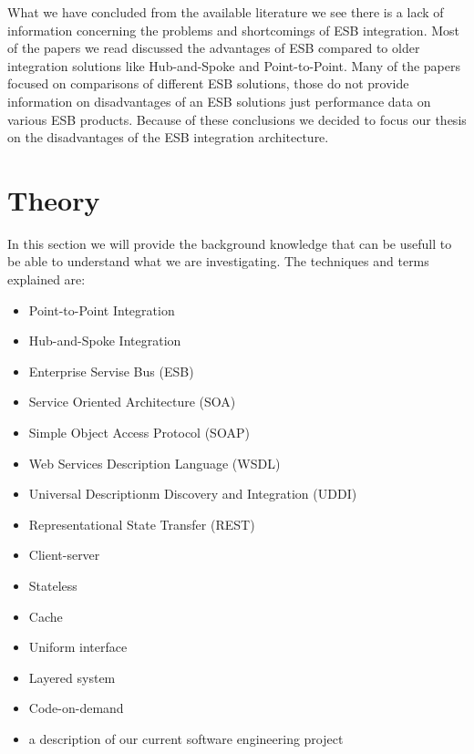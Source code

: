 \documentclass{llncs}
\begin{document}
What we have concluded from the available literature we see there is a lack of information concerning the problems and shortcomings of ESB integration.
Most of the papers we read discussed the advantages of ESB compared to older integration solutions like Hub-and-Spoke and Point-to-Point. Many of the papers focused on comparisons of different ESB solutions, those do not provide information on disadvantages of an ESB solutions just performance data on various ESB products. Because of these conclusions we decided to focus our thesis on the disadvantages of the ESB integration architecture.

\section{Theory}
In this section we will provide the background knowledge that can be usefull to be able to understand what we are investigating.
The techniques and terms explained are:
\begin{itemize}
\item Point-to-Point Integration
\item Hub-and-Spoke Integration
\item Enterprise Servise Bus (ESB)
\item Service Oriented Architecture (SOA)
\item Simple Object Access Protocol (SOAP)
\item Web Services Description Language (WSDL)
\item Universal Descriptionm Discovery and Integration (UDDI)
\item Representational State Transfer (REST)
\item Client-server
\item Stateless
\item Cache
\item Uniform interface
\item Layered system
\item Code-on-demand
\item a description of our current software engineering project
\end{itemize}

\label{sec:background}
\end{document}
